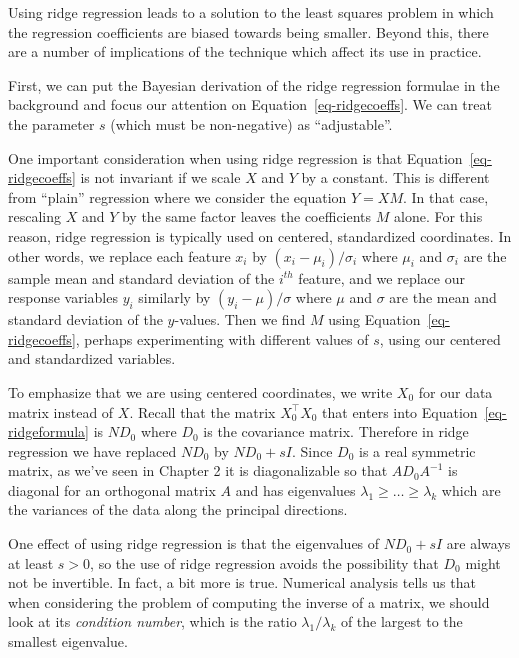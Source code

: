 \documentclass[
  11pt,
  letterpaper,
]{scrbook}
\theoremstyle{plain}
\theoremstyle{remark}
\begin{document}
Using ridge regression leads to a solution to the least squares problem
in which the regression coefficients are biased towards being smaller.
Beyond this, there are a number of implications of the technique which
affect its use in practice.

First, we can put the Bayesian derivation of the ridge regression
formulae in the background and focus our attention on
Equation~\ref{eq-ridgecoeffs}. We can treat the parameter \(s\) (which
must be non-negative) as ``adjustable''.

One important consideration when using ridge regression is that
Equation~\ref{eq-ridgecoeffs} is not invariant if we scale \(X\) and
\(Y\) by a constant. This is different from ``plain'' regression where
we consider the equation \(Y=XM\). In that case, rescaling \(X\) and
\(Y\) by the same factor leaves the coefficients \(M\) alone. For this
reason, ridge regression is typically used on centered, standardized
coordinates. In other words, we replace each feature \(x_i\) by
\((x_i-\mu_i)/\sigma_i\) where \(\mu_i\) and \(\sigma_i\) are the sample
mean and standard deviation of the \(i^{th}\) feature, and we replace
our response variables \(y_i\) similarly by \((y_i-\mu)/\sigma\) where
\(\mu\) and \(\sigma\) are the mean and standard deviation of the
\(y\)-values. Then we find \(M\) using Equation~\ref{eq-ridgecoeffs},
perhaps experimenting with different values of \(s\), using our centered
and standardized variables.

To emphasize that we are using centered coordinates, we write \(X_{0}\)
for our data matrix instead of \(X\). Recall that the matrix
\(X_0^{\intercal}X_0\) that enters into Equation~\ref{eq-ridgeformula}
is \(ND_{0}\) where \(D_{0}\) is the covariance matrix. Therefore in
ridge regression we have replaced \(ND_0\) by \(ND_0+sI\). Since \(D_0\)
is a real symmetric matrix, as we've seen in Chapter 2 it is
diagonalizable so that \(AD_0A^{-1}\) is diagonal for an orthogonal
matrix \(A\) and has eigenvalues \(\lambda_1\ge \ldots\ge \lambda_k\)
which are the variances of the data along the principal directions.

One effect of using ridge regression is that the eigenvalues of
\(ND_{0}+sI\) are always at least \(s>0\), so the use of ridge
regression avoids the possibility that \(D_{0}\) might not be
invertible. In fact, a bit more is true. Numerical analysis tells us
that when considering the problem of computing the inverse of a matrix,
we should look at its \emph{condition number}, which is the ratio
\(\lambda_1/\lambda_k\) of the largest to the smallest eigenvalue.
\end{document}

